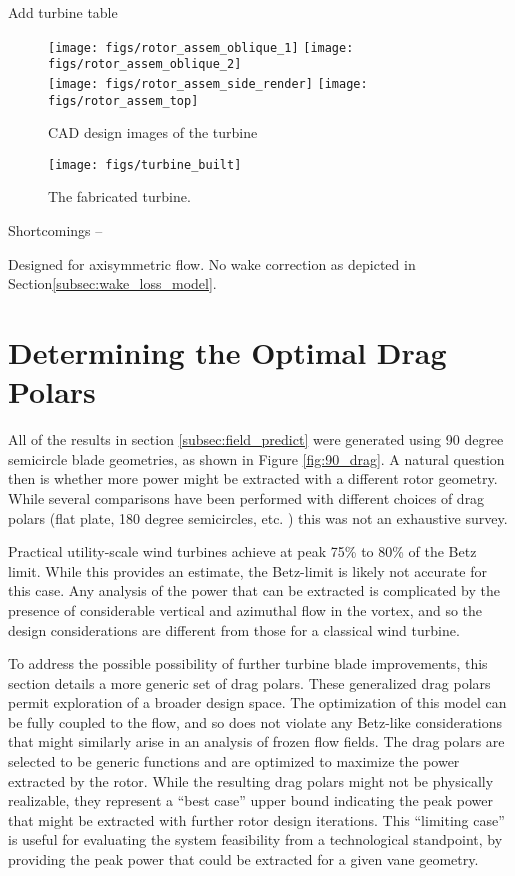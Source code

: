 Add turbine table

  \begin{figure}
   \centering
   \texttt{[image: figs/rotor\_assem\_oblique\_1]}
   \hfill
   \texttt{[image: figs/rotor\_assem\_oblique\_2]}
   \\
   \vspace{1em}
   \texttt{[image: figs/rotor\_assem\_side\_render]}
   \hfill
   \texttt{[image: figs/rotor\_assem\_top]}
   \\   
   \caption{CAD design images of the turbine} 
   \label{fig:cad_turbine}
  \end{figure}


  \begin{figure}
   \centering
   \texttt{[image: figs/turbine\_built]}
   \caption{The fabricated turbine.} 
   \label{fig:turbine_built}
  \end{figure}

Shortcomings -- 

Designed for axisymmetric flow. No wake correction as depicted in
Section\ref{subsec:wake_loss_model}.    

\section{Determining the Optimal Drag Polars}

All of the results in section \ref{subsec:field_predict} were generated
using 90 degree semicircle blade geometries, as shown in Figure
\ref{fig:90_drag}. A natural question then is whether more power might
be extracted with a different rotor geometry. While several comparisons
have been performed with different choices of drag polars (flat plate,
180 degree semicircles, etc. ) this was not an exhaustive survey. 

Practical utility-scale wind turbines achieve at peak 75\% to 80\% of
the Betz limit\cite{?}. While this provides an estimate, the Betz-limit
is likely not accurate for this case. Any analysis of the power that can
be extracted is complicated by the presence of considerable vertical and
azimuthal flow in the vortex, and so the design considerations are
different from those for a classical wind turbine.

To address the possible possibility of further turbine blade
improvements, this section details a more generic set of drag
polars. These generalized drag polars permit exploration of a broader
design space. The optimization of this model can be fully coupled to the
flow, and so does not violate any Betz-like considerations that might
similarly arise in an analysis of frozen flow fields.
The drag polars are selected to be generic functions and are optimized to
maximize the power extracted by the rotor. While the resulting drag
polars might not be physically  realizable, they represent a ``best
case'' upper bound indicating the peak power that might be extracted
with further rotor design iterations. This ``limiting case'' is useful
for evaluating the system feasibility from a technological standpoint,
by providing the peak power that could be extracted for a given vane
geometry. 

